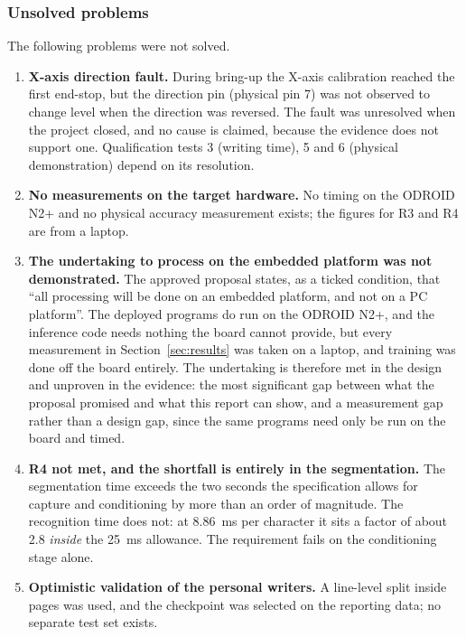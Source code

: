     \subsubsection{Unsolved problems}
    \label{sec:dis-unsolved}

        The following problems were not solved.

        \begin{enumerate}
          \item \textbf{X-axis direction fault.} During bring-up the X-axis calibration reached the first end-stop, but the direction pin (physical pin 7) was not observed to change level when the direction was reversed.
          The fault was unresolved when the project closed, and no cause is claimed, because the evidence does not support one.
          Qualification tests 3 (writing time), 5 and 6 (physical demonstration) depend on its resolution.
          \item \textbf{No measurements on the target hardware.} No timing on the ODROID N2+ and no physical accuracy measurement exists; the figures for R3 and R4 are from a laptop.
          \item \textbf{The undertaking to process on the embedded platform was not demonstrated.} The approved proposal states, as a ticked condition, that ``all processing will be done on an embedded platform, and not on a PC platform''.
          The deployed programs do run on the ODROID N2+, and the inference code needs nothing the board cannot provide, but every measurement in Section~\ref{sec:results} was taken on a laptop, and training was done off the board entirely.
          The undertaking is therefore met in the design and unproven in the evidence: the most significant gap between what the proposal promised and what this report can show, and a measurement gap rather than a design gap, since the same programs need only be run on the board and timed.
          \item \textbf{R4 not met, and the shortfall is entirely in the segmentation.} The segmentation time exceeds the two seconds the specification allows for capture and conditioning by more than an order of magnitude. The recognition time does not: at 8.86~ms per character it sits a factor of about 2.8 \emph{inside} the 25~ms allowance. The requirement fails on the conditioning stage alone.
          \item \textbf{Optimistic validation of the personal writers.} A line-level split inside pages was used, and the checkpoint was selected on the reporting data; no separate test set exists.

\end{enumerate}
